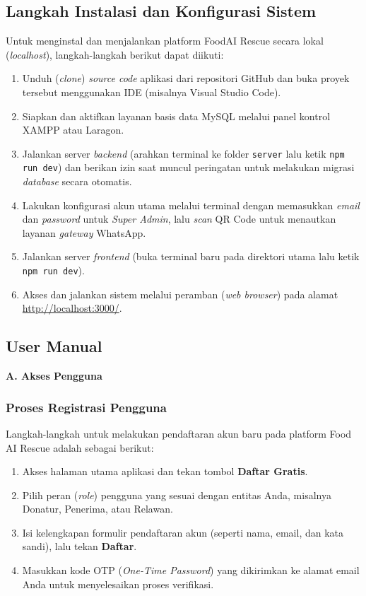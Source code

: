 \subsection{Langkah Instalasi dan Konfigurasi Sistem}
Untuk menginstal dan menjalankan platform FoodAI Rescue secara lokal (\textit{localhost}), langkah-langkah berikut dapat diikuti:

\begin{enumerate}[label=\arabic*.]
    \item Unduh (\textit{clone}) \textit{source code} aplikasi dari repositori GitHub dan buka proyek tersebut menggunakan IDE (misalnya Visual Studio Code).
    \item Siapkan dan aktifkan layanan basis data MySQL melalui panel kontrol XAMPP atau Laragon.
    \item Jalankan server \textit{backend} (arahkan terminal ke folder \texttt{server} lalu ketik \texttt{npm run dev}) dan berikan izin saat muncul peringatan untuk melakukan migrasi \textit{database} secara otomatis.
    \item Lakukan konfigurasi akun utama melalui terminal dengan memasukkan \textit{email} dan \textit{password} untuk \textit{Super Admin}, lalu \textit{scan} QR Code untuk menautkan layanan \textit{gateway} WhatsApp.
    \item Jalankan server \textit{frontend} (buka terminal baru pada direktori utama lalu ketik \texttt{npm run dev}).
    \item Akses dan jalankan sistem melalui peramban (\textit{web browser}) pada alamat \url{http://localhost:3000/}.
\end{enumerate}

\subsection{User Manual}

\textbf{A. Akses Pengguna}

\subsubsection{Proses Registrasi Pengguna}
Langkah-langkah untuk melakukan pendaftaran akun baru pada platform Food AI Rescue adalah sebagai berikut:
\begin{enumerate}[label=\arabic*.]
    \item Akses halaman utama aplikasi dan tekan tombol \textbf{Daftar Gratis}.
    \item Pilih peran (\textit{role}) pengguna yang sesuai dengan entitas Anda, misalnya Donatur, Penerima, atau Relawan.
    \item Isi kelengkapan formulir pendaftaran akun (seperti nama, email, dan kata sandi), lalu tekan \textbf{Daftar}.
    \item Masukkan kode OTP (\textit{One-Time Password}) yang dikirimkan ke alamat email Anda untuk menyelesaikan proses verifikasi.
\end{enumerate}

